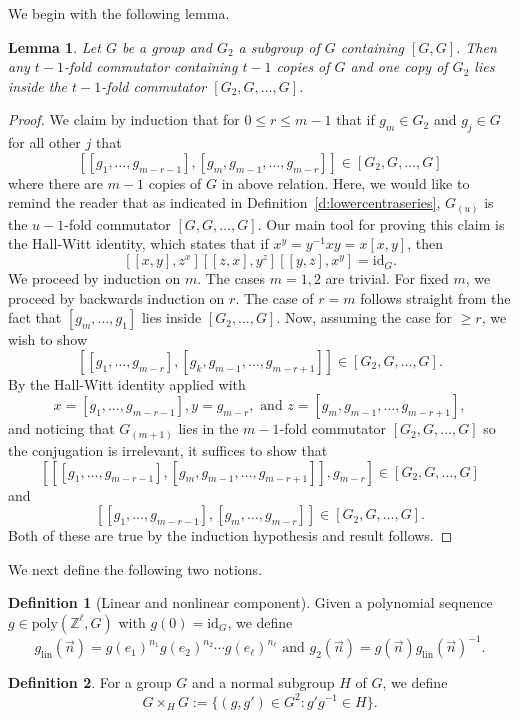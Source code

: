 \documentclass[11pt, a4paper]{amsart}
\theoremstyle{plain}
\theoremstyle{plain}
\newtheorem{lemma}{Lemma}
\theoremstyle{definition}
\newtheorem{definition}{Definition}
\theoremstyle{remark}
\numberwithin{equation}{section}
\numberwithin{lemma}{section}
\numberwithin{proposition}{section}
\numberwithin{corollary}{section}
\numberwithin{definition}{section}
\numberwithin{claim}{section}
\begin{document}
We begin with the following lemma.
\begin{lemma}\label{l:commutatorlemma}
Let $G$ be a group and $G_2$ a subgroup of $G$ containing $[G, G]$. Then any $t - 1$-fold commutator containing $t - 1$ copies of $G$ and one copy of $G_2$ lies inside the $t - 1$-fold commutator $[G_2, G, \dots, G]$.
\end{lemma}
\begin{proof}
We claim by induction that for $0 \le r \le m - 1$ that if $g_m \in G_2$ and $g_j \in G$ for all other $j$ that
$$[[g_1, \dots, g_{m - r - 1}], [g_m, g_{m - 1}, \dots, g_{m - r}]] \in [G_2, G, \dots, G]$$
where there are $m - 1$ copies of $G$ in above relation. Here, we would like to remind the reader that as indicated in Definition~\ref{d:lowercentraseries}, $G_{(u)}$ is the $u - 1$-fold commutator $[G, G, \dots, G]$. Our main tool for proving this claim is the Hall-Witt identity, which states that if $x^y = y^{-1}xy = x[x, y]$, then
$$[[x, y], z^x][[z, x], y^z][[y, z], x^y] = \mathrm{id}_G.$$
We proceed by induction on $m$. The cases $m = 1, 2$ are trivial. For fixed $m$, we proceed by backwards induction on $r$. The case of $r = m$ follows straight from the fact that $[g_m, \dots, g_1]$ lies inside $[G_2, \dots, G]$. Now, assuming the case for $\ge r$, we wish to show
$$[[g_1, \dots, g_{m - r}], [g_k, g_{m - 1}, \dots, g_{m - r + 1}]] \in [G_2, G, \dots, G].$$
By the Hall-Witt identity applied with
$$x = [g_1, \dots, g_{m - r - 1}], y = g_{m - r}, \text{ and } z = [g_m, g_{m - 1}, \dots, g_{m - r + 1}],$$
and noticing that $G_{(m + 1)}$ lies in the $m - 1$-fold commutator $[G_2, G, \dots, G]$ so the conjugation is irrelevant, it suffices to show that
$$[[[g_1, \dots, g_{m - r - 1}], [g_m, g_{m - 1}, \dots, g_{m - r + 1}]], g_{m - r}] \in [G_2, G, \dots, G]$$
and
$$[[g_1, \dots, g_{m - r - 1}], [g_m, \dots, g_{m -r}]] \in [G_2, G, \dots, G].$$
Both of these are true by the induction hypothesis and result follows.
\end{proof}
We next define the following two notions.
\begin{definition}[Linear and nonlinear component]\label{d:gling2}
Given a polynomial sequence $g \in \mathrm{poly}(\mathbb{Z}^\ell, G)$ with $g(0) = \mathrm{id}_G$, we define
$$g_{\mathrm{lin}}(\vec{n}) = g(e_1)^{n_1} g(e_2)^{n_2} \cdots g(e_\ell)^{n_\ell} \text{ and } g_2(\vec{n}) = g(\vec{n})g_{\mathrm{lin}}(\vec{n})^{-1}.$$
\end{definition}
\begin{definition}\label{d:joining}
For a group $G$ and a normal subgroup $H$ of $G$, we define
$$G \times_{H} G := \{(g, g') \in G^2: g'g^{-1} \in H\}.$$
\end{definition}
\end{document}
